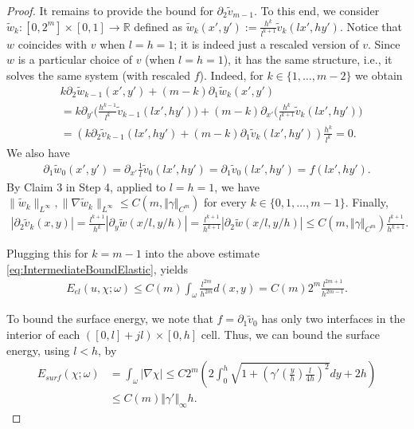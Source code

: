 \documentclass[a4paper, 10pt, twoside, notitlepage]{amsart}
\theoremstyle{plain}
\newcommand{\R}{\mathbb{R}}
\newcommand{\p}{\partial}
\begin{document}
\begin{proof}
                          
                           It remains to provide the bound for $\p_2 \tilde{v}_{m-1}$.
To this end, we consider $\tilde w_k:[0,2^m]\times[0,1]\to\R$ defined as $\tilde w_k(x',y'):=\frac{h^k}{l^{k+1}}\tilde v_k(lx',hy')$.
Notice that $w$ coincides with $v$ when $l=h=1$; it is indeed just a rescaled version of $v$.
Since $w$ is a particular choice of $v$ (when $l=h=1$), it has the same structure, i.e., it solves the same system (with rescaled $f$).
Indeed, for $k\in \{1,\dots,m-2\}$ we obtain
\begin{align*}
&k\p_2 \tilde w_{k-1}(x',y')+(m-k)\p_1 \tilde w_k(x',y') \\
&= k\p_{y'} \Big(\frac{h^{k-1}}{l^{k}}\tilde v_{k-1}(lx',hy')\Big)+(m-k)\p_{x'} \Big(\frac{h^k}{l^{k+1}} \tilde v_k(lx',hy')\Big) \\
&= (k\p_2 \tilde v_{k-1}(lx',hy')+(m-k)\p_1\tilde v_k(lx',hy'))\frac{h^k}{l^{k}}=0.
\end{align*}
We also have
\begin{align*}
\p_1\tilde w_0(x',y')=\p_{x'}\frac{1}{l}\tilde v_{0}(lx',hy')=\p_1\tilde v_{0}(lx',hy')=f(lx',hy').
\end{align*}
By Claim 3 in Step 4, applied to $l=h=1$, we have $\|\tilde w_k\|_{L^\infty},\|\nabla \tilde w_k\|_{L^\infty}\leq C(m,\Vert \gamma \Vert_{C^m})$ for every $k \in \{0,1,\dots, m-1\}$.
Finally,
\begin{align*}
|\p_2\tilde v_k(x,y)|=\frac{l^{k+1}}{{h^k}}|\p_y\tilde w(x/l,y/h)|=\frac{l^{k+1}}{h^{k+1}}|\p_2\tilde w(x/l,y/h)|\leq C(m,\Vert \gamma \Vert_{C^m}) \frac{l^{k+1}}{h^{k+1}}.
\end{align*}


  Plugging this for $k=m-1$ into the above estimate \cref{eq:IntermediateBoundElastic}, yields
 \begin{align*}
    E_{el}(u,\chi;\omega) \leq C(m) \int_\omega \frac{l^{2m}}{h^{2m}} d(x,y) = C(m) 2^m \frac{l^{2m+1}}{h^{2m-1}}.
  \end{align*}




  To bound the surface energy, we note that $f=\p_1\tilde{v}_0$ has only two interfaces in the interior of each $([0,l] + jl) \times [0,h]$ cell.
  Thus, we can bound the surface energy, using $l < h$, by
                            \begin{align*}
                              E_{surf}(\chi;\omega) & = \int_\omega |\nabla \chi| \leq C 2^m \left(2 \int_0^h \sqrt{1+\left( \gamma'(\frac{y}{h}) \frac{l}{4h}\right)^2} dy + 2h \right) \\
                              & \leq C(m) \Vert \gamma' \Vert_\infty h.
                            \end{align*}
                          
		\end{proof}
		
\end{document}
